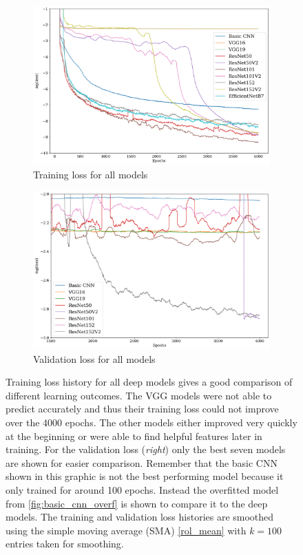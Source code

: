 \begin{figure}[H]
\begin{subfigure}{.5\textwidth}
    \centering
    \includegraphics[width=\linewidth]{images/Chapter4/Results/tr_loss_hist.png}
    \caption{Training loss for all models}
    \label{fig:history_all_training_loss}
\end{subfigure}
\begin{subfigure}{.5\textwidth}
    \centering
    \includegraphics[width=\linewidth]{images/Chapter4/Results/val_loss_hist.png}
    \caption{Validation loss for all models}
    \label{fig:history_all_validation_loss}
\end{subfigure}
\caption{Training loss history for all deep models gives a good comparison of different learning outcomes. The VGG models were not able to predict accurately and thus their training loss could not improve over the 4000 epochs. The other models either improved very quickly at the beginning or were able to find helpful features later in training. For the validation loss (\textit{right}) only the best seven models are shown for easier comparison. Remember that the basic CNN shown in this graphic is not the best performing model because it only trained for around 100 epochs. Instead the overfitted model from \autoref{fig:basic_cnn_overf} is shown to compare it to the deep models. The training and validation loss histories are smoothed using the simple moving average (SMA) \eqref{rol_mean} with $k = 100$ entries taken for smoothing.}
\label{fig:history_all}
\end{figure}

